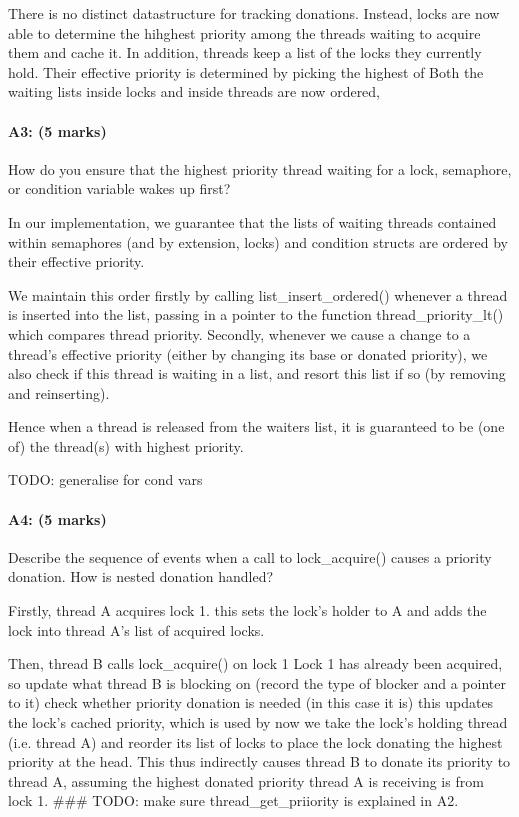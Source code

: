 There is no distinct datastructure for tracking donations.
Instead, locks are now able to determine the hihghest priority among the threads waiting to acquire them and cache it.
In addition, threads keep a list of the locks they currently hold. Their effective priority is determined by picking the highest of 
Both the waiting lists inside locks and inside threads are now ordered, 

\paragraph{A3: (5 marks)}
How do you ensure that the highest priority thread waiting for a lock, semaphore, or condition variable wakes up first?

In our implementation, we guarantee that the lists of waiting threads contained within semaphores (and by extension, locks) and condition structs are ordered by their effective priority.

We maintain this order firstly by calling list_insert_ordered() whenever a thread is inserted into the list, passing in a pointer to the function thread_priority_lt() which compares thread priority. Secondly, whenever we cause a change to a thread's effective priority (either by changing its base or donated priority), we also check if this thread is waiting in a list, and resort this list if so (by removing and reinserting).

Hence when a thread is released from the waiters list, it is guaranteed to be (one of) the thread(s) with highest priority.

TODO: generalise for cond vars

\paragraph{A4: (5 marks)}
Describe the sequence of events when a call to lock\_acquire() causes a priority donation.  How is nested donation handled?

  Firstly, thread A acquires lock 1.
    this sets the lock's holder to A and adds the lock into thread A's list of acquired locks.

  Then, thread B calls lock_acquire() on lock 1
  Lock 1 has already been acquired, so
    update what thread B is blocking on (record the type of blocker and a pointer to it)
    check whether priority donation is needed (in this case it is)
      this updates the lock's cached priority, which is used by 
    now we take the lock's holding thread (i.e. thread A) and reorder its list of locks to place the lock donating the highest priority at the head. This thus indirectly causes thread B to donate its priority to thread A, assuming the highest donated priority thread A is receiving is from lock 1.
    ### TODO: make sure thread_get_priiority is explained in A2.

